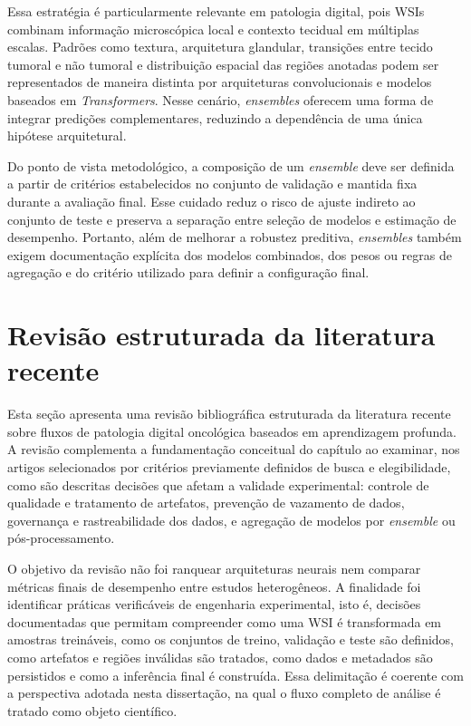 Essa estratégia é particularmente relevante em patologia digital, pois WSIs combinam informação microscópica local e contexto tecidual em múltiplas escalas. Padrões como textura, arquitetura glandular, transições entre tecido tumoral e não tumoral e distribuição espacial das regiões anotadas podem ser representados de maneira distinta por arquiteturas convolucionais e modelos baseados em \textit{Transformers}. Nesse cenário, \textit{ensembles} oferecem uma forma de integrar predições complementares, reduzindo a dependência de uma única hipótese arquitetural. 

Do ponto de vista metodológico, a composição de um \textit{ensemble} deve ser definida a partir de critérios estabelecidos no conjunto de validação e mantida fixa durante a avaliação final. Esse cuidado reduz o risco de ajuste indireto ao conjunto de teste e preserva a separação entre seleção de modelos e estimação de desempenho. Portanto, além de melhorar a robustez preditiva, \textit{ensembles} também exigem documentação explícita dos modelos combinados, dos pesos ou regras de agregação e do critério utilizado para definir a configuração final.

\section{Revisão estruturada da literatura recente} \label{sec:revisao_literatura_recente} 

Esta seção apresenta uma revisão bibliográfica estruturada da literatura recente sobre fluxos de patologia digital oncológica baseados em aprendizagem profunda. A revisão complementa a fundamentação conceitual do capítulo ao examinar, nos artigos selecionados por critérios previamente definidos de busca e elegibilidade, como são descritas decisões que afetam a validade experimental: controle de qualidade e tratamento de artefatos, prevenção de vazamento de dados, governança e rastreabilidade dos dados, e agregação de modelos por \textit{ensemble} ou pós-processamento. 

O objetivo da revisão não foi ranquear arquiteturas neurais nem comparar métricas finais de desempenho entre estudos heterogêneos. A finalidade foi identificar práticas verificáveis de engenharia experimental, isto é, decisões documentadas que permitam compreender como uma WSI é transformada em amostras treináveis, como os conjuntos de treino, validação e teste são definidos, como artefatos e regiões inválidas são tratados, como dados e metadados são persistidos e como a inferência final é construída. Essa delimitação é coerente com a perspectiva adotada nesta dissertação, na qual o fluxo completo de análise é tratado como objeto científico. 

